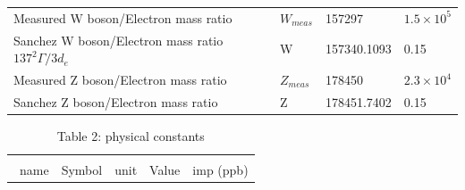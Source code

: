\documentclass[a4paper,9pt]{article}
\begin{document}
\begin{appendix}
\begin{table}
\begin{tabular}{llll}
     Measured W boson/Electron mass ratio  & $W_{meas}$ & 157297  & $1.5 \times 10^5$ \\
     
    Sanchez W boson/Electron mass ratio $137^2\Gamma/3d_e$  & W & 157340.1093  & 0.15 \\
     
    Measured Z boson/Electron mass ratio  & $Z_{meas}$ & 178450  & $2.3 \times 10^4$ \\
     
     Sanchez Z boson/Electron mass ratio  & Z & 178451.7402  & 0.15 \\
         
   \bottomrule
  \end{tabular}
\end{table}


\begin{table}
\caption{Table 2: physical constants}
\label{tab:2:table2}
  \hskip-2.0cm\begin{tabular}{lllll}
    \toprule
    \multicolumn{5}{c}{}                  \\
    \cmidrule(r){1-5}
    \ name & Symbol  & unit  & Value & imp (ppb) \\
    \midrule
  

\end{tabular}
\end{table}
\end{appendix}
\end{document}

